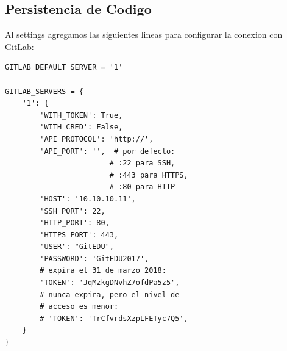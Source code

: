 \subsection{Persistencia de Codigo}
Al settings agregamos las siguientes lineas para configurar la conexion con GitLab:
\lstset{language=Python}
\begin{lstlisting}
GITLAB_DEFAULT_SERVER = '1'

GITLAB_SERVERS = {
    '1': {
        'WITH_TOKEN': True,
        'WITH_CRED': False,
        'API_PROTOCOL': 'http://',
        'API_PORT': '',  # por defecto:
                        # :22 para SSH,
                        # :443 para HTTPS,
                        # :80 para HTTP
        'HOST': '10.10.10.11',
        'SSH_PORT': 22,
        'HTTP_PORT': 80,
        'HTTPS_PORT': 443,
        'USER': "GitEDU",
        'PASSWORD': 'GitEDU2017',
        # expira el 31 de marzo 2018:
        'TOKEN': 'JqMzkgDNvhZ7ofdPa5z5',
        # nunca expira, pero el nivel de 
        # acceso es menor:
        # 'TOKEN': 'TrCfvrdsXzpLFETyc7Q5',  
    }
}
\end{lstlisting}
\lstset{language=Bash}

